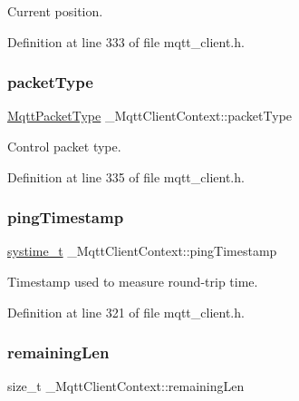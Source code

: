 Current position. 



Definition at line 333 of file mqtt\+\_\+client.\+h.

\mbox{\label{struct__MqttClientContext_a415d74e2059829a1e52fb4e45c6c1fbf}} 
\subsubsection{\texorpdfstring{packet\+Type}{packetType}}
{\footnotesize\ttfamily \hyperlink{mqtt__common_8h_af26b642b7ef813ac269f70aa245cc796}{Mqtt\+Packet\+Type} \+\_\+\+Mqtt\+Client\+Context\+::packet\+Type}



Control packet type. 



Definition at line 335 of file mqtt\+\_\+client.\+h.

\mbox{\label{struct__MqttClientContext_a64e70d9946fbf80b98da11bdebb23562}} 
\subsubsection{\texorpdfstring{ping\+Timestamp}{pingTimestamp}}
{\footnotesize\ttfamily \hyperlink{compiler__port_8h_ae3e32a98d431a02106616da3071832dd}{systime\+\_\+t} \+\_\+\+Mqtt\+Client\+Context\+::ping\+Timestamp}



Timestamp used to measure round-\/trip time. 



Definition at line 321 of file mqtt\+\_\+client.\+h.

\mbox{\label{struct__MqttClientContext_a7e6fefef3fa8dba77c9eb6a2ea78ad1c}} 
\subsubsection{\texorpdfstring{remaining\+Len}{remainingLen}}
{\footnotesize\ttfamily size\+\_\+t \+\_\+\+Mqtt\+Client\+Context\+::remaining\+Len}



